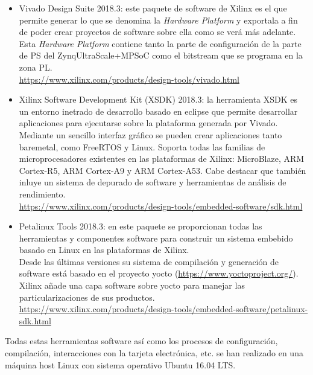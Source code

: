 \begin{itemize}
  \item Vivado Design Suite 2018.3: este paquete de software de Xilinx es el que permite generar lo que se denomina la \textit{Hardware Platform} y exportala a fin de poder crear proyectos de software sobre ella como se verá más adelante. Esta \textit{Hardware Platform} contiene tanto la parte de configuración de la parte de PS del Zynq\textregistered UltraScale+\texttrademark MPSoC como el bitstream que se programa en la zona PL.\\
  \url{https://www.xilinx.com/products/design-tools/vivado.html}
  \item Xilinx Software Development Kit (XSDK) 2018.3: la herramienta \acrshort{XSDK} es un entorno inetrado de desarrollo basado en eclipse que permite desarrollar aplicaciones para ejecutarse sobre la plataforma generada por Vivado. Mediante un sencillo interfaz gráfico se pueden crear aplicaciones tanto baremetal, como FreeRTOS y Linux. Soporta todas las familias de microprocesadores existentes en las plataformas de Xilinx: MicroBlaze, ARM Cortex-R5, ARM Cortex-A9 y ARM Cortex-A53. Cabe destacar que también inluye un sistema de depurado de software y herramientas de análisis de rendimiento.\\
  \url{https://www.xilinx.com/products/design-tools/embedded-software/sdk.html}
  \item Petalinux Tools 2018.3: en este paquete se proporcionan todas las herramientas y componentes software para construir un sistema embebido basado en Linux en las plataformas de Xilinx.\\
  Desde las últimas versiones su sistema de compilación y generación de software está basado en el proyecto yocto (\url{https://www.yoctoproject.org/}). Xilinx añade una capa software sobre yocto para manejar las particularizaciones de sus productos.\\
  \url{https://www.xilinx.com/products/design-tools/embedded-software/petalinux-sdk.html}
\end{itemize}

Todas estas herramientas software así como los procesos de configuración, compilación, interacciones con la tarjeta electrónica, etc. se han realizado en una máquina host Linux con sistema operativo Ubuntu 16.04 LTS.
